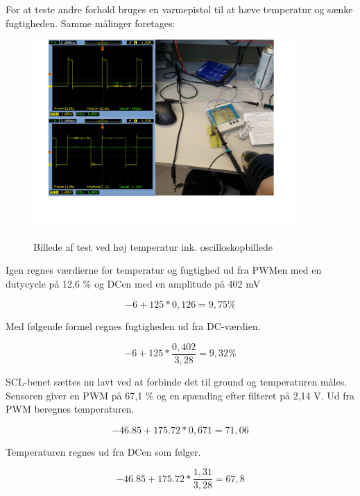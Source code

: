 For at teste andre forhold bruges en varmepistol til at hæve temperatur og sænke fugtigheden. 
Samme målinger foretages:

\begin{figure}[h]
\centering
{\includegraphics[width=0.90\textwidth]{filer/modultest/Billeder/test_varmt}}
\caption{Billede af test ved høj temperatur ink. oscilloskopbillede}
\label{lab:test_varmt}
\end{figure}

Igen regnes værdierne for temperatur og fugtighed ud fra PWMen med en dutycycle på 12,6 \% og DCen med en amplitude på 402 mV

\begin{equation}
-6+125*0,126= 9,75\%
\end{equation}

Med følgende formel regnes fugtigheden ud fra DC-værdien.

\begin{equation}
-6+125*\frac{0,402}{3,28}= 9,32\%
\end{equation}

SCL-benet sættes nu lavt ved at forbinde det til ground og temperaturen måles. Sensoren giver en PWM på 67,1 \% og en spænding efter filteret på 2,14 V. Ud fra PWM beregnes temperaturen.


\begin{equation}
-46.85+175.72*0,671=71,06
\end{equation}

Temperaturen regnes ud fra DCen som følger. 

\begin{equation}
-46.85+175.72*\frac{1,31}{3,28}=67,8
\end{equation}

